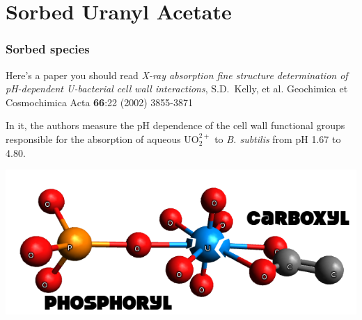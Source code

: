 \documentclass[10pt, xcolor=x11names, compress]{beamer}
\begin{document}
\section{Sorbed Uranyl Acetate}
\label{sec:uace}

\begin{frame}
  \frametitle{Sorbed species}
  \begin{block}{Here's a paper you should read}
    \small
    \textit{X-ray absorption fine structure determination of
      pH-dependent U-bacterial cell wall interactions}, %
    S.D.\ Kelly, et al. Geochimica et Cosmochimica Acta \textbf{66}:22
    (2002) 3855-3871
  \end{block}

  \medskip

  In it, the authors measure the pH dependence of the cell wall
  functional groups responsible for the absorption of aqueous
  UO$_2^{2+}$ to \textit{B. subtilis} from pH 1.67 to 4.80.

  \begin{center}
    \includegraphics[width=0.6\linewidth]{images/uranyl.png}
  \end{center}
\end{frame}
\end{document}
